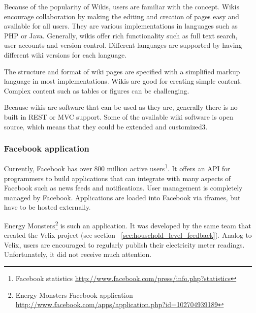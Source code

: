Because of the popularity of Wikis, users are familiar with the concept. Wikis encourage collaboration by making the editing and creation of pages easy and available for all users. They are various implementations in languages such as PHP or Java. Generally, wikis offer rich functionality such as full text search, user accounts and version control. Different languages are supported by having different wiki versions for each language.  

The structure and format of wiki pages are specified with a simplified markup language in most implementations. Wikis are good for creating simple content. Complex content such as tables or figures can be challenging\cite{wikis_collaboration}.

Because wikis are software that can be used as they are, generally there is no built in REST or MVC support. Some of the available wiki software is open source, which means that they could be extended and customized3.

\subsubsection{Facebook application}
Currently, Facebook has over 800 million active users\footnote{Facebook statistics \url{http://www.facebook.com/press/info.php?statistics}}. It offers an API for programmers to build applications that can integrate with many aspects of Facebook such as news feeds and notifications. User management is completely managed by Facebook. Applications are loaded into Facebook via iframes, but have to be hosted externally.

Energy Monsters\footnote{Energy Monsters Facebook application \url{http://www.facebook.com/apps/application.php?id=102704939189}} is such an application. It was developed by the same team that created the Velix project (see section ~\ref{sec:household_level_feedback}). Analog to Velix, users are encouraged to regularly publish their electricity meter readings. %
Unfortunately, it did not receive much attention. 	


